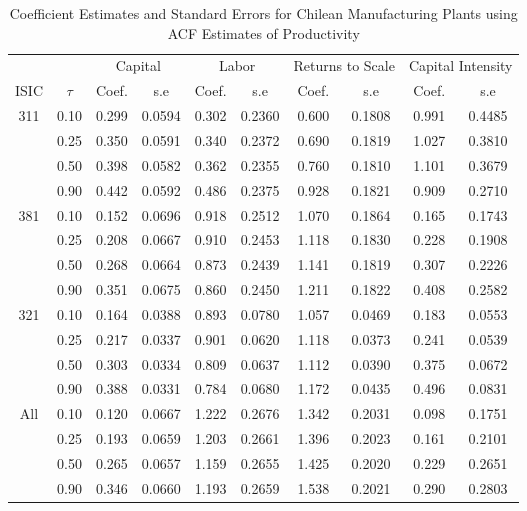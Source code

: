 \documentclass[11pt]{article}
\begin{document}
\begin{table}[H]
\centering
\caption{Coefficient Estimates and Standard Errors for Chilean Manufacturing Plants using ACF Estimates of Productivity}
\begin{tabular}{cccccccccc}
  \hline\hline & & \multicolumn{2}{c}{Capital}  & \multicolumn{2}{c}{Labor} & \multicolumn{2}{c}{Returns to Scale} & \multicolumn{2}{c}{Capital Intensity}\\ \cmidrule(lr){3-4} \cmidrule(lr){5-6} \cmidrule(lr){7-8} \cmidrule(lr){9-10}ISIC & $\tau$ & Coef. & s.e & Coef. & s.e & Coef. & s.e & Coef. & s.e \\ 
  \hline
311 & 0.10 & 0.299 & 0.0594 & 0.302 & 0.2360 & 0.600 & 0.1808 & 0.991 & 0.4485 \\ 
   & 0.25 & 0.350 & 0.0591 & 0.340 & 0.2372 & 0.690 & 0.1819 & 1.027 & 0.3810 \\ 
   & 0.50 & 0.398 & 0.0582 & 0.362 & 0.2355 & 0.760 & 0.1810 & 1.101 & 0.3679 \\ 
   & 0.90 & 0.442 & 0.0592 & 0.486 & 0.2375 & 0.928 & 0.1821 & 0.909 & 0.2710 \\ 
  381 & 0.10 & 0.152 & 0.0696 & 0.918 & 0.2512 & 1.070 & 0.1864 & 0.165 & 0.1743 \\ 
   & 0.25 & 0.208 & 0.0667 & 0.910 & 0.2453 & 1.118 & 0.1830 & 0.228 & 0.1908 \\ 
   & 0.50 & 0.268 & 0.0664 & 0.873 & 0.2439 & 1.141 & 0.1819 & 0.307 & 0.2226 \\ 
   & 0.90 & 0.351 & 0.0675 & 0.860 & 0.2450 & 1.211 & 0.1822 & 0.408 & 0.2582 \\ 
  321 & 0.10 & 0.164 & 0.0388 & 0.893 & 0.0780 & 1.057 & 0.0469 & 0.183 & 0.0553 \\ 
   & 0.25 & 0.217 & 0.0337 & 0.901 & 0.0620 & 1.118 & 0.0373 & 0.241 & 0.0539 \\ 
   & 0.50 & 0.303 & 0.0334 & 0.809 & 0.0637 & 1.112 & 0.0390 & 0.375 & 0.0672 \\ 
   & 0.90 & 0.388 & 0.0331 & 0.784 & 0.0680 & 1.172 & 0.0435 & 0.496 & 0.0831 \\ 
  All & 0.10 & 0.120 & 0.0667 & 1.222 & 0.2676 & 1.342 & 0.2031 & 0.098 & 0.1751 \\ 
   & 0.25 & 0.193 & 0.0659 & 1.203 & 0.2661 & 1.396 & 0.2023 & 0.161 & 0.2101 \\ 
   & 0.50 & 0.265 & 0.0657 & 1.159 & 0.2655 & 1.425 & 0.2020 & 0.229 & 0.2651 \\ 
   & 0.90 & 0.346 & 0.0660 & 1.193 & 0.2659 & 1.538 & 0.2021 & 0.290 & 0.2803 \\ 
   \hline
\end{tabular}
\label{CHLestACF}
\end{table}
\end{document}
